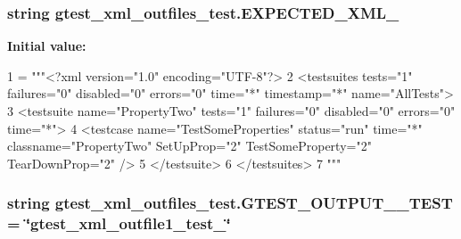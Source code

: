 \subsubsection[{E\+X\+P\+E\+C\+T\+E\+D\+\_\+\+X\+M\+L\+\_\+2}]{\setlength{\rightskip}{0pt plus 5cm}string gtest\+\_\+xml\+\_\+outfiles\+\_\+test.\+E\+X\+P\+E\+C\+T\+E\+D\+\_\+\+X\+M\+L\+\_}\label{namespacegtest__xml__outfiles__test_a765455244a8cd7b3f32a51f0cda4157e}
{\bfseries Initial value\+:}
\begin{DoxyCode}
1 = \textcolor{stringliteral}{"""<?xml version="1.0" encoding="UTF-8"?>}
2 \textcolor{stringliteral}{<testsuites tests="1" failures="0" disabled="0" errors="0" time="*" timestamp="*" name="AllTests">}
3 \textcolor{stringliteral}{  <testsuite name="PropertyTwo" tests="1" failures="0" disabled="0" errors="0" time="*">}
4 \textcolor{stringliteral}{    <testcase name="TestSomeProperties" status="run" time="*" classname="PropertyTwo" SetUpProp="2"
       TestSomeProperty="2" TearDownProp="2" />}
5 \textcolor{stringliteral}{  </testsuite>}
6 \textcolor{stringliteral}{</testsuites>}
7 \textcolor{stringliteral}{"""}
\end{DoxyCode}
\hypertarget{namespacegtest__xml__outfiles__test_a92ab09e944d010f8abfaa3ca453fa68c}{}
\subsubsection[{G\+T\+E\+S\+T\+\_\+\+O\+U\+T\+P\+U\+T\+\_\+1\+\_\+\+T\+E\+S\+T}]{\setlength{\rightskip}{0pt plus 5cm}string gtest\+\_\+xml\+\_\+outfiles\+\_\+test.\+G\+T\+E\+S\+T\+\_\+\+O\+U\+T\+P\+U\+T\+\_\+\_\+\+T\+E\+S\+T = \char`\"{}gtest\+\_\+xml\+\_\+outfile1\+\_\+test\+\_\+\char`\"{}}\label{namespacegtest__xml__outfiles__test_a92ab09e944d010f8abfaa3ca453fa68c}
\hypertarget{namespacegtest__xml__outfiles__test_acf82219e56619aab5c114b6f0a7c3a5e}{}
